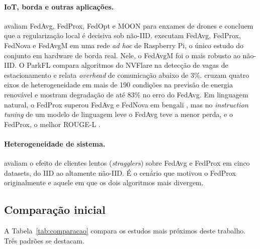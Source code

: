 \paragraph{IoT, borda e outras aplicações.}
\citet{hu2025uav} avaliam FedAvg, FedProx, FedOpt e MOON para enxames de drones e concluem que a regularização local é decisiva sob não-IID. \citet{carranco2025adhoc} executam FedAvg, FedProx, FedNova e FedAvgM em uma rede \textit{ad hoc} de Raspberry Pi, o único estudo do conjunto em hardware de borda real. Nele, o FedAvgM foi o mais robusto ao não-IID. O ParkFL \citep{bakr2026parkfl} compara algoritmos do NVFlare na detecção de vagas de estacionamento e relata \textit{overhead} de comunicação abaixo de 3\%. \citet{ghosh2026renewable} cruzam quatro eixos de heterogeneidade em mais de 190 condições na previsão de energia renovável e mostram degradação de até 83\% no erro do FedAvg. Em linguagem natural, o FedProx superou FedAvg e FedNova em bengali \citep{julekha2026bangla}, mas no \textit{instruction tuning} de um modelo de linguagem leve o FedAvg teve a menor perda, e o FedProx, o melhor ROUGE-L \citep{tan2026instruction}.

\paragraph{Heterogeneidade de sistema.}
\citet{cheng2026stragglers} avaliam o efeito de clientes lentos (\textit{stragglers}) sobre FedAvg e FedProx em cinco datasets, do IID ao altamente não-IID. É o cenário que motivou o FedProx originalmente e aquele em que os dois algoritmos mais divergem.

\subsection{Comparação inicial}

A Tabela~\ref{tab:comparacao} compara os estudos mais próximos deste trabalho. Três padrões se destacam.

